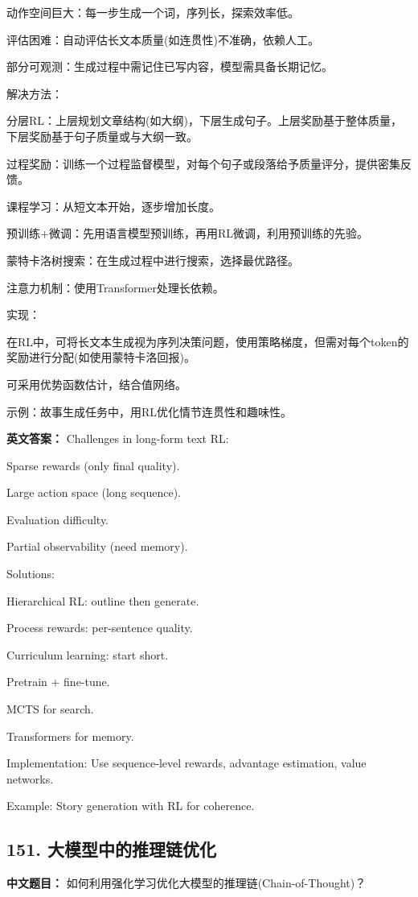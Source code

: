 \documentclass[10pt,a4paper]{ctexart}
\begin{document}
动作空间巨大：每一步生成一个词，序列长，探索效率低。

评估困难：自动评估长文本质量(如连贯性)不准确，依赖人工。

部分可观测：生成过程中需记住已写内容，模型需具备长期记忆。

解决方法：

分层RL：上层规划文章结构(如大纲)，下层生成句子。上层奖励基于整体质量，下层奖励基于句子质量或与大纲一致。

过程奖励：训练一个过程监督模型，对每个句子或段落给予质量评分，提供密集反馈。

课程学习：从短文本开始，逐步增加长度。

预训练+微调：先用语言模型预训练，再用RL微调，利用预训练的先验。

蒙特卡洛树搜索：在生成过程中进行搜索，选择最优路径。

注意力机制：使用Transformer处理长依赖。

实现：

在RL中，可将长文本生成视为序列决策问题，使用策略梯度，但需对每个token的奖励进行分配(如使用蒙特卡洛回报)。

可采用优势函数估计，结合值网络。

示例：故事生成任务中，用RL优化情节连贯性和趣味性。

\textbf{英文答案：}
Challenges in long-form text RL:

Sparse rewards (only final quality).

Large action space (long sequence).

Evaluation difficulty.

Partial observability (need memory).

Solutions:

Hierarchical RL: outline then generate.

Process rewards: per-sentence quality.

Curriculum learning: start short.

Pretrain + fine-tune.

MCTS for search.

Transformers for memory.

Implementation: Use sequence-level rewards, advantage estimation, value networks.

Example: Story generation with RL for coherence.

\subsection*{151. 大模型中的推理链优化}
\textbf{中文题目：} 如何利用强化学习优化大模型的推理链(Chain-of-Thought)？
\end{document}
